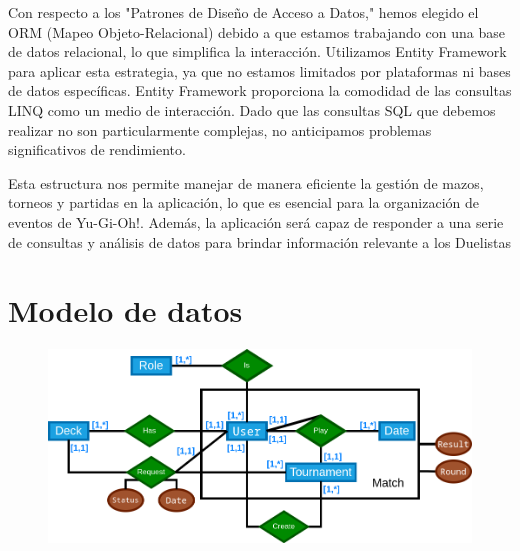 \documentclass[a4paper]{article}
\begin{document}
Con respecto a los "Patrones de Diseño de Acceso a Datos," hemos elegido el ORM (Mapeo Objeto-Relacional) debido a que estamos trabajando con una base de datos relacional, lo que simplifica la interacción. Utilizamos Entity Framework para aplicar esta estrategia, ya que no estamos limitados por plataformas ni bases de datos específicas. Entity Framework proporciona la comodidad de las consultas LINQ como un medio de interacción. Dado que las consultas SQL que debemos realizar no son particularmente complejas, no anticipamos problemas significativos de rendimiento.

Esta estructura nos permite manejar de manera eficiente la gestión de mazos, torneos y partidas en la aplicación, lo que es esencial para la organización de eventos de Yu-Gi-Oh!. Además, la aplicación será capaz de responder a una serie de consultas y análisis de datos para brindar información relevante a los Duelistas
\newpage
\section{Modelo de datos}
	\begin{figure}[h]
  		\includegraphics[width=1\textwidth]{merx.png} 
	\end{figure}
\end{document}
